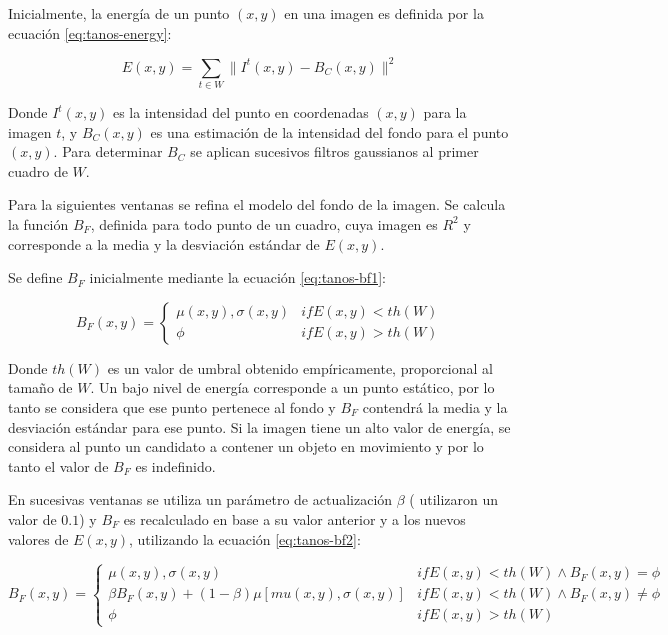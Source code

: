 \documentclass[a4paper,10pt]{article}
\begin{document}
Inicialmente, la energía de un punto $(x, y)$ en una imagen es definida por la
ecuación \ref{eq:tanos-energy}:

\begin{equation}
    \label{eq:tanos-energy}
    E(x, y) = \sum_{t \in W} \| I^t(x, y) - B_C (x, y) \| ^2
\end{equation}

Donde  $I^t(x, y)$ es la intensidad del punto en coordenadas $(x, y)$ para la
imagen $t$, y $B_C(x, y)$ es una estimación de la intensidad del fondo para el
punto $(x, y)$. Para determinar $B_C$ se aplican sucesivos filtros gaussianos
al primer cuadro de $W$.

Para la siguientes ventanas se refina el modelo del fondo de la imagen. Se
calcula la función $B_F$, definida para todo punto de un cuadro, cuya imagen es
$R^2$ y corresponde a la media y la desviación estándar de $E(x, y)$.

Se define $B_F$ inicialmente mediante la ecuación \ref{eq:tanos-bf1}:

\begin{equation}
  \label{eq:tanos-bf1}
  B_F(x, y) =
  \begin{cases}
    \mu(x, y), \sigma(x, y) & if E(x, y) < th(W) \\
    \phi & if E(x, y) > th(W)
  \end{cases}
\end{equation}

Donde $th(W)$ es un valor de umbral obtenido empíricamente, proporcional al
tamaño de $W$. Un bajo nivel de energía corresponde a un punto estático,
por lo tanto se considera que ese punto pertenece al fondo y $B_F$
contendrá la media y la desviación estándar para ese punto. Si la imagen
tiene un alto valor de energía, se considera al punto un candidato a
contener un objeto en movimiento y por lo tanto el valor de $B_F$ es
indefinido.

En sucesivas ventanas se utiliza un parámetro de actualización $\beta$
(\citeauthor*{papers-tanos} utilizaron un valor de $0.1$) y $B_F$ es
recalculado en base a su valor anterior y a los nuevos valores de $E(x, y)$,
utilizando la ecuación \ref{eq:tanos-bf2}:

\begin{equation} \label{eq:tanos-bf2}
  B_F(x, y) = \begin{cases}
    \mu(x, y), \sigma(x, y) & if E(x, y) < th(W) \wedge B_F(x, y) = \phi \\
    \beta B_F(x, y) + (1-\beta) \mu\left[mu(x, y), \sigma(x, y)\right] & if E(x, y) < th(W) \wedge B_F(x, y) \neq \phi \\
    \phi & if E(x, y) > th(W)
  \end{cases}
\end{equation}
\end{document}
